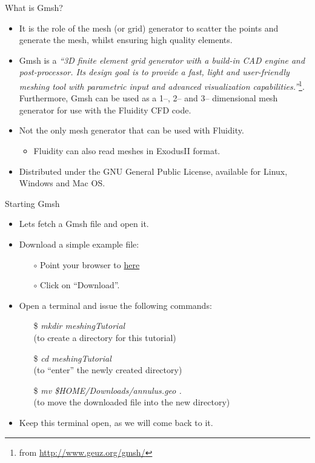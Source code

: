 \documentclass[t]{beamer}
\begin{document}
\begin{frame}{What is Gmsh?}
\begin{itemize}
\item It is the role of the mesh (or grid) generator to scatter the points and generate the mesh, whilst ensuring high quality elements.
\item Gmsh is a \emph{``3D finite element grid generator with a build-in CAD engine and post-processor. Its design goal is to provide a fast, light and user-friendly meshing tool with parametric input and advanced visualization capabilities.''}\footnote{from \url{http://www.geuz.org/gmsh/}}. Furthermore, Gmsh can be used as a 1--, 2-- and 3-- dimensional mesh generator for use with the Fluidity CFD code.
\item Not the only mesh generator that can be used with Fluidity.
\begin{itemize}
   \item Fluidity can also read meshes in ExodusII format.
\end{itemize}
\item Distributed under the GNU General Public License, available for Linux, Windows and Mac OS.
\end{itemize}
\end{frame}

\begin{frame}{Starting Gmsh}
\begin{itemize}
   \item Lets fetch a Gmsh file and open it.
   \item Download a simple example file:
   \begin{itemize}
      \item[$\circ$] Point your browser to \href{http://figshare.com/s/b0936b565f8211e4aee906ec4b8d1f61}{here}
      \item[$\circ$] Click on ``Download''.
   \end{itemize}
   \item Open a terminal and issue the following commands:\\[10pt]
   \begin{itemize}
      \item[\$] \emph{mkdir meshingTutorial} \\(to create a directory for this tutorial)
      \item[\$] \emph{cd meshingTutorial} \\(to ``enter'' the newly created directory)
      \item[\$] \emph{mv \$HOME/Downloads/annulus.geo .} \\(to move the downloaded file into the new directory)
   \end{itemize}
   \item Keep this terminal open, as we will come back to it.\\
\end{itemize}
\end{frame}
\end{document}
